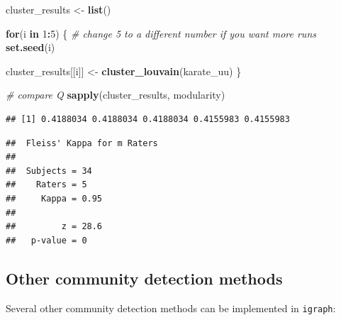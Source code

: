 \documentclass[
]{book}
\newenvironment{Shaded}{\begin{snugshade}}{\end{snugshade}}
\newcommand{\CommentTok}[1]{\textcolor[rgb]{0.56,0.35,0.01}{\textit{#1}}}
\newcommand{\ControlFlowTok}[1]{\textcolor[rgb]{0.13,0.29,0.53}{\textbf{#1}}}
\newcommand{\DecValTok}[1]{\textcolor[rgb]{0.00,0.00,0.81}{#1}}
\newcommand{\FunctionTok}[1]{\textcolor[rgb]{0.13,0.29,0.53}{\textbf{#1}}}
\newcommand{\NormalTok}[1]{#1}
\newcommand{\OtherTok}[1]{\textcolor[rgb]{0.56,0.35,0.01}{#1}}
\newcommand{\SpecialCharTok}[1]{\textcolor[rgb]{0.81,0.36,0.00}{\textbf{#1}}}
\begin{document}
\begin{Shaded}
\begin{Highlighting}[]
\NormalTok{cluster\_results }\OtherTok{\textless{}{-}} \FunctionTok{list}\NormalTok{()}

\ControlFlowTok{for}\NormalTok{(i }\ControlFlowTok{in} \DecValTok{1}\SpecialCharTok{:}\DecValTok{5}\NormalTok{) \{ }\CommentTok{\# change 5 to a different number if you want more runs }
  \FunctionTok{set.seed}\NormalTok{(i)}
  
\NormalTok{  cluster\_results[[i]] }\OtherTok{\textless{}{-}} \FunctionTok{cluster\_louvain}\NormalTok{(karate\_uu)}
\NormalTok{\}}

\CommentTok{\# compare Q}
\FunctionTok{sapply}\NormalTok{(cluster\_results, modularity)}
\end{Highlighting}
\end{Shaded}

\begin{verbatim}
## [1] 0.4188034 0.4188034 0.4188034 0.4155983 0.4155983
\end{verbatim}

\begin{Shaded}
\end{Shaded}

\begin{verbatim}
##  Fleiss' Kappa for m Raters
## 
##  Subjects = 34 
##    Raters = 5 
##     Kappa = 0.95 
## 
##         z = 28.6 
##   p-value = 0
\end{verbatim}

\subsection{Other community detection methods}\label{other-community-detection-methods}

Several other community detection methods can be implemented in \texttt{igraph}:
\end{document}
